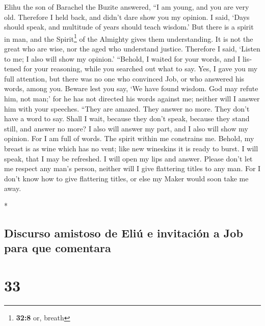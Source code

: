 \begin{paracol}{2}
\begin{otherlanguage}{english}
 Elihu the son of Barachel the Buzite answered, ``I am
young, and you are very old. Therefore I held back, and didn't dare show
you my opinion.  I said, `Days should speak, and multitude
of years should teach wisdom.'  But there is a spirit in
man, and the Spirit\footnote{\textbf{32:8} or, breath} of the Almighty
gives them understanding.  It is not the great who are
wise, nor the aged who understand justice.  Therefore I
said, `Listen to me; I also will show my opinion.' 
``Behold, I waited for your words, and I listened for your reasoning,
while you searched out what to say.  Yes, I gave you my
full attention, but there was no one who convinced Job, or who answered
his words, among you.  Beware lest you say, `We have
found wisdom. God may refute him, not man;'  for he has
not directed his words against me; neither will I answer him with your
speeches.  ``They are amazed. They answer no more. They
don't have a word to say.  Shall I wait, because they
don't speak, because they stand still, and answer no more?
 I also will answer my part, and I also will show my
opinion.  For I am full of words. The spirit within me
constrains me.  Behold, my breast is as wine which has no
vent; like new wineskins it is ready to burst.  I will
speak, that I may be refreshed. I will open my lips and answer.
 Please don't let me respect any man's person, neither
will I give flattering titles to any man.  For I don't
know how to give flattering titles, or else my Maker would soon take me
away.

\end{otherlanguage}

\switchcolumn[0]*

\hypertarget{discurso-amistoso-de-eliuxfa-e-invitaciuxf3n-a-job-para-que-comentara}{%
\subsection{Discurso amistoso de Eliú e invitación a Job para que
comentara}\label{discurso-amistoso-de-eliuxfa-e-invitaciuxf3n-a-job-para-que-comentara}}

\hypertarget{section-64}{%
\section{33}\label{section-64}}


\end{paracol}
